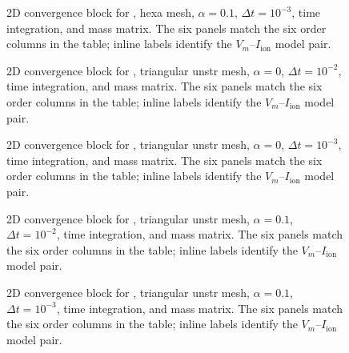 \begin{figure}[p]
\centering
{}
\caption{2D convergence block for , hexa mesh, $\alpha=0.1$, $\Delta t=10^{-3}$,  time integration, and  mass matrix. The six panels match the six order columns in the table; inline labels identify the $V_m$--$I_{\mathrm{ion}}$ model pair.}
\label{fig:results-2d-jfnk-hexa-alpha-1p0em01-1p0em03}
\end{figure}
\FloatBarrier

\begin{figure}[p]
\centering
{}
\caption{2D convergence block for , triangular unstr mesh, $\alpha=0$, $\Delta t=10^{-2}$,  time integration, and  mass matrix. The six panels match the six order columns in the table; inline labels identify the $V_m$--$I_{\mathrm{ion}}$ model pair.}
\label{fig:results-2d-jfnk-triangular-unstr-alpha-0p0e00-1p0em02}
\end{figure}
\FloatBarrier

\begin{figure}[p]
\centering
{}
\caption{2D convergence block for , triangular unstr mesh, $\alpha=0$, $\Delta t=10^{-3}$,  time integration, and  mass matrix. The six panels match the six order columns in the table; inline labels identify the $V_m$--$I_{\mathrm{ion}}$ model pair.}
\label{fig:results-2d-jfnk-triangular-unstr-alpha-0p0e00-1p0em03}
\end{figure}
\FloatBarrier

\begin{figure}[p]
\centering
{}
\caption{2D convergence block for , triangular unstr mesh, $\alpha=0.1$, $\Delta t=10^{-2}$,  time integration, and  mass matrix. The six panels match the six order columns in the table; inline labels identify the $V_m$--$I_{\mathrm{ion}}$ model pair.}
\label{fig:results-2d-jfnk-triangular-unstr-alpha-1p0em01-1p0em02}
\end{figure}
\FloatBarrier

\begin{figure}[p]
\centering
{}
\caption{2D convergence block for , triangular unstr mesh, $\alpha=0.1$, $\Delta t=10^{-3}$,  time integration, and  mass matrix. The six panels match the six order columns in the table; inline labels identify the $V_m$--$I_{\mathrm{ion}}$ model pair.}
\label{fig:results-2d-jfnk-triangular-unstr-alpha-1p0em01-1p0em03}
\end{figure}
\FloatBarrier

